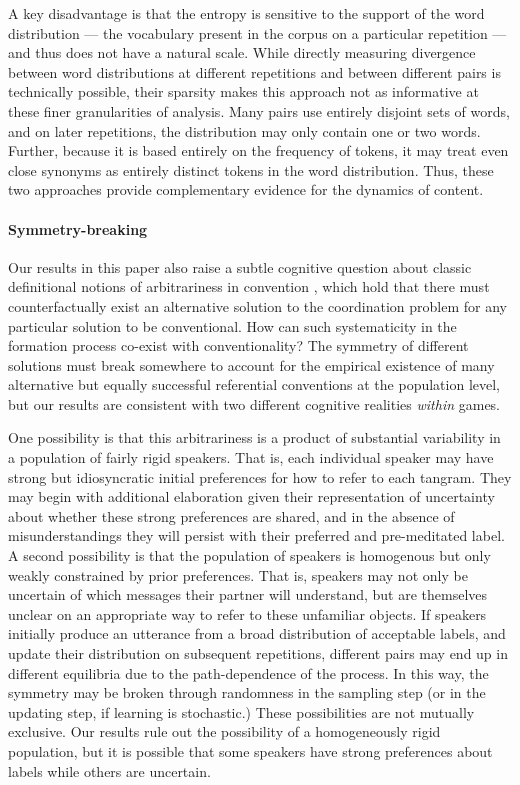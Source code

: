 \documentclass[alpha-refs]{wiley-article}
\begin{document}
A key disadvantage is that the entropy is sensitive to the support of the word distribution --- the vocabulary present in the corpus on a particular repetition --- and thus does not have a natural scale.
While directly measuring divergence between word distributions at different repetitions and between different pairs is technically possible, their sparsity makes this approach not as informative at these finer granularities of analysis.
Many pairs use entirely disjoint sets of words, and on later repetitions, the distribution may only contain one or two words. 
Further, because it is based entirely on the frequency of tokens, it may treat even close synonyms as entirely distinct tokens in the word distribution. 
Thus, these two approaches provide complementary evidence for the dynamics of content.

\paragraph{Symmetry-breaking}
Our results in this paper also raise a subtle cognitive question about classic definitional notions of arbitrariness in convention \citep{Lewis69_Convention}, which hold that there must counterfactually exist an alternative solution to the coordination problem for any particular solution to be conventional.
How can such systematicity in the formation process co-exist with conventionality?
The symmetry of different solutions must break somewhere to account for the empirical existence of many alternative but equally successful referential conventions at the population level, but our results are consistent with two different cognitive realities \emph{within} games.

One possibility is that this arbitrariness is a product of substantial variability in a population of fairly rigid speakers.
That is, each individual speaker may have strong but idiosyncratic initial preferences for how to refer to each tangram. 
They may begin with additional elaboration given their representation of uncertainty about whether these strong preferences are shared, and in the absence of misunderstandings they will persist with their preferred and pre-meditated label.
A second possibility is that the population of speakers is homogenous but only weakly constrained by prior preferences. 
That is, speakers may not only be uncertain of which messages their partner will understand, but are themselves unclear on an appropriate way to refer to these unfamiliar objects.
If speakers initially produce an utterance from a broad distribution of acceptable labels, and update their distribution on subsequent repetitions, different pairs may end up in different equilibria due to the path-dependence of the process. 
In this way, the symmetry may be broken through randomness in the sampling step (or in the updating step, if learning is stochastic.)
These possibilities are not mutually exclusive.
Our results rule out the possibility of a homogeneously rigid population, but it is possible that some speakers have strong preferences about labels while others are uncertain.
\end{document}
